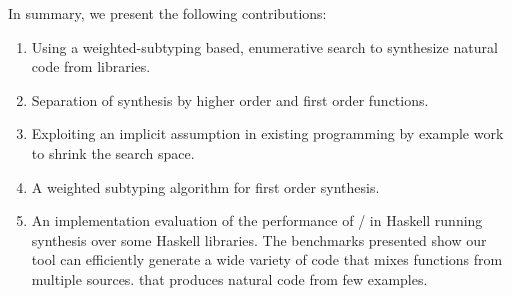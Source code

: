 In summary, we present the following contributions:

\begin{enumerate}
\item Using a weighted-subtyping based, enumerative search to synthesize natural code from libraries.
\item Separation of synthesis by higher order and first order functions.
\item Exploiting an implicit assumption in existing programming by example work to shrink the search space.
\item A weighted subtyping algorithm for first order synthesis.
\item An implementation evaluation of the performance of \ourTool/ in Haskell running synthesis over some Haskell libraries. The benchmarks presented show our tool can efficiently generate a wide variety of code that mixes functions from multiple sources. that produces natural code from few examples.
\end{enumerate}
